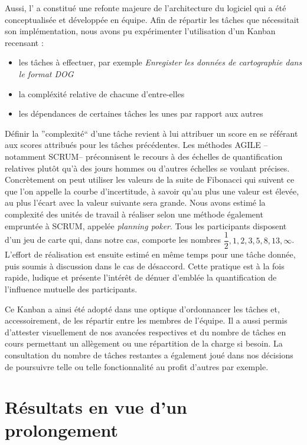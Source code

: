   Aussi, l' a constitué une refonte majeure de l'architecture du logiciel qui a été conceptualisée et développée en équipe. 
  Afin de répartir les tâches que nécessitait son implémentation, nous avons pu expérimenter l'utilisation d'un \gls{Kanban} recensant : 
  
  \begin{itemize}
   \item les tâches à effectuer, par exemple \emph{Enregister les données de cartographie dans le format DOG}
   \item la compléxité relative de chacune d'entre-elles 
   \item les dépendances de certaines tâches les unes par rapport aux autres
  \end{itemize}

  Définir la ''complexité`` d'une tâche revient à lui attribuer un score en se référant aux scores attribués pour les tâches précédentes. 
  Les méthodes AGILE --notamment SCRUM-- préconnisent le recours à des échelles de quantification relatives plutôt qu'à des jours hommes ou d'autres échelles se voulant précises. 
  Concrètement on peut utiliser les valeurs de la suite de Fibonacci qui suivent ce que l'on appelle la courbe d'incertitude, à savoir qu'au plus une valeur est élevée, au plus l'écart avec la valeur suivante sera grande. 
  Nous avons estimé la complexité des unités de travail à réaliser selon une méthode également empruntée à SCRUM, appelée \emph{planning poker}. 
  Tous les participants disposent d'un jeu de carte qui, dans notre cas, comporte les nombres $\dfrac{1}2, 1, 2, 3, 5, 8, 13, \infty$. 
  L'effort de réalisation est ensuite estimé en même temps pour une tâche donnée, puis soumis à discussion dans le cas de désaccord. 
  Cette pratique est à la fois rapide, ludique et présente l'intérêt de dénuer d'emblée la quantification de l'influence mutuelle des participants. 
  
  Ce Kanban a ainsi été adopté dans une optique d'ordonnancer les tâches et, accessoirement, de les répartir entre les membres de l'équipe. 
  Il a aussi permis d'attester visuellement de nos avancées respectives et du nombre de tâches en cours permettant un allègement ou une répartition de la charge si besoin.
  La consultation du nombre de tâches restantes a également joué dans nos décisions de poursuivre telle ou telle fonctionnalité au profit d'autres par exemple. 
  
\section{Résultats en vue d'un prolongement}  
